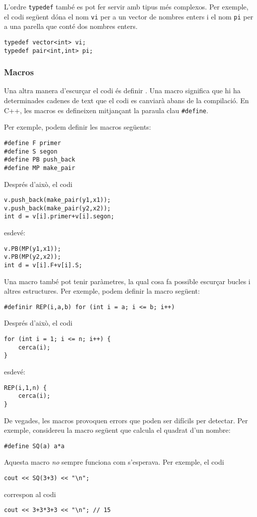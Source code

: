 L'ordre \texttt{typedef}
també es pot fer servir amb tipus més complexos.
Per exemple, el codi següent dóna
el nom \texttt{vi} per a un vector de nombres enters
i el nom \texttt{pi} per a una parella
que conté dos nombres enters.
\begin{lstlisting}
typedef vector<int> vi;
typedef pair<int,int> pi;
\end{lstlisting}

\subsubsection{Macros}
Una altra manera d'escurçar el codi és definir
.
Una macro significa que hi ha determinades cadenes
de text que el codi es canviarà abans de la compilació.
En C++, les macros es defineixen mitjançant la paraula
clau \texttt{\#define}.

Per exemple, podem definir les macros següents:
\begin{lstlisting}
#define F primer
#define S segon
#define PB push_back
#define MP make_pair
\end{lstlisting}
Després d'això, el codi
\begin{lstlisting}
v.push_back(make_pair(y1,x1));
v.push_back(make_pair(y2,x2));
int d = v[i].primer+v[i].segon;
\end{lstlisting}
esdevé:
\begin{lstlisting}
v.PB(MP(y1,x1));
v.PB(MP(y2,x2));
int d = v[i].F+v[i].S;
\end{lstlisting}

Una macro també pot tenir paràmetres,
la qual cosa fa possible escurçar bucles i altres
estructures.
Per exemple, podem definir la macro següent:
\begin{lstlisting}
#definir REP(i,a,b) for (int i = a; i <= b; i++)
\end{lstlisting}
Després d'això, el codi
\begin{lstlisting}
for (int i = 1; i <= n; i++) {
    cerca(i);
}
\end{lstlisting}
esdevé:
\begin{lstlisting}
REP(i,1,n) {
    cerca(i);
}
\end{lstlisting}

De vegades, les macros provoquen errors que poden ser difícils
per detectar. Per exemple, considereu la macro següent
que calcula el quadrat d'un nombre:
\begin{lstlisting}
#define SQ(a) a*a
\end{lstlisting}
Aquesta macro \emph{no} sempre funciona com s'esperava.
Per exemple, el codi
\begin{lstlisting}
cout << SQ(3+3) << "\n";
\end{lstlisting}
correspon al codi
\begin{lstlisting}
cout << 3+3*3+3 << "\n"; // 15
\end{lstlisting}

